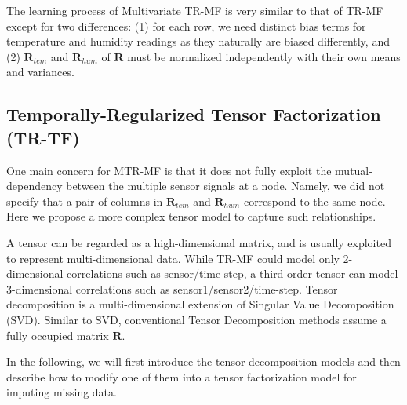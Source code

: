 The learning process of Multivariate TR-MF is very similar to that of TR-MF except for two differences:
(1) for each row, we need distinct bias terms for temperature and humidity readings as they naturally are biased differently, and (2) $\mathbf{R}_{tem}$ and $\mathbf{R}_{hum}$ of $\mathbf{R}$ must be normalized independently with their own means and variances. 

 
\subsection{Temporally-Regularized Tensor Factorization (TR-TF)} \label{sec:tensordecomp}

One main concern for MTR-MF is that it does not fully exploit the mutual-dependency between the 
multiple sensor signals at a node. Namely, we did not specify that a pair of columns in 
$\mathbf{R}_{tem}$ and $\mathbf{R}_{hum}$ correspond to the same node. Here we propose a more 
complex tensor model to capture such relationships.

A tensor can be regarded as a high-dimensional matrix, and is usually exploited to represent 
multi-dimensional data.  While TR-MF could model only 2-dimensional correlations such as
sensor/time-step, a third-order tensor can model 3-dimensional correlations
such as sen\-sor1/sensor2/time-step.
%
Tensor decomposition is a multi-dimensional extension of Singular Value Decomposition (SVD). Similar to SVD, conventional Tensor Decomposition methods assume a fully occupied matrix $\mathbf{R}$.

In the following, we will first introduce the tensor decomposition models and then describe how to modify one of them into a tensor factorization model for imputing missing data.

 
